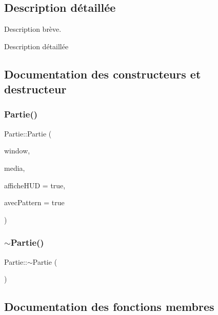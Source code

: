 \subsection{Description détaillée}
Description brève. 

Description détaillée 

\subsection{Documentation des constructeurs et destructeur}
\mbox{\label{class_partie_a480ca8b79b54d01f4d1f1722f6c42935}} 
\subsubsection{\texorpdfstring{Partie()}{Partie()}}
{\footnotesize\ttfamily Partie\+::\+Partie (\begin{DoxyParamCaption}\item[{sf\+::\+Render\+Window \&}]{window,  }\item[{\hyperlink{class_input__base_a455585e7933485981b3d7bfcad3a47c6}{Input\+::\+Media}}]{media,  }\item[{bool}]{affiche\+H\+UD = {\ttfamily true},  }\item[{bool}]{avec\+Pattern = {\ttfamily true} }\end{DoxyParamCaption})}

\mbox{\label{class_partie_ae4afeb7336bb84427272cfb7018b5e3d}} 
\subsubsection{\texorpdfstring{$\sim$\+Partie()}{~Partie()}}
{\footnotesize\ttfamily Partie\+::$\sim$\+Partie (\begin{DoxyParamCaption}{ }\end{DoxyParamCaption})}



\subsection{Documentation des fonctions membres}
\mbox{\label{class_partie_a2ed02302df62c0867ebec0fc83078da3}} 
